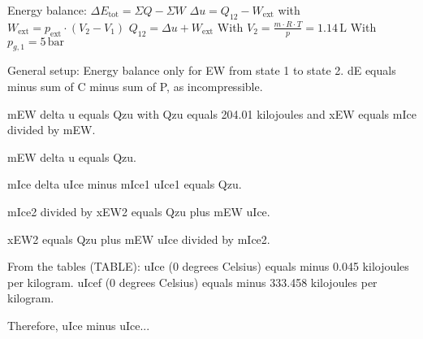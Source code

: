 Energy balance:  
\( \Delta E_{\text{tot}} = \Sigma Q - \Sigma W \)  
\( \Delta u = Q_{12} - W_{\text{ext}} \) with \( W_{\text{ext}} = p_{\text{ext}} \cdot (V_2 - V_1) \)  
\( Q_{12} = \Delta u + W_{\text{ext}} \)  
With \( V_2 = \frac{m \cdot R \cdot T}{p} = 1.14 \, \text{L} \)  
With \( p_{g,1} = 5 \, \text{bar} \)

General setup:  
Energy balance only for EW from state 1 to state 2.  
dE equals minus sum of C minus sum of P, as incompressible.  

mEW delta u equals Qzu with Qzu equals 204.01 kilojoules and xEW equals mIce divided by mEW.  

mEW delta u equals Qzu.  

mIce delta uIce minus mIce1 uIce1 equals Qzu.  

mIce2 divided by xEW2 equals Qzu plus mEW uIce.  

xEW2 equals Qzu plus mEW uIce divided by mIce2.  

From the tables (TABLE):  
uIce (0 degrees Celsius) equals minus 0.045 kilojoules per kilogram.  
uIcef (0 degrees Celsius) equals minus 333.458 kilojoules per kilogram.  

Therefore, uIce minus uIce...
